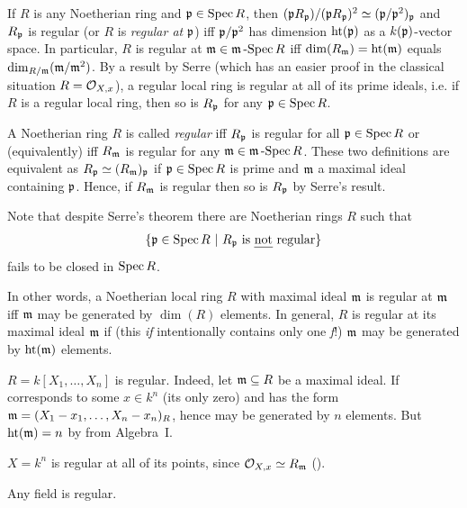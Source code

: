 \documentclass[a4paper,parskip=half,numbers=enddot, DIV=12]{scrreprt}
\begin{document}
\begin{rem}
    If $R$ is any Noetherian ring and $\mathfrak{p}\in \operatorname{Spec} R$, then $(\mathfrak{p} R_{\mathfrak{p}})/(\mathfrak{p} R_{\mathfrak{p}})^2 \simeq (\mathfrak{p}/\mathfrak{p}^2)_{\mathfrak{p}}$ and $R_{\mathfrak{p}}$ is regular (or $R$ is \emph{regular at} $\mathfrak{p}$) iff $\mathfrak{p}/\mathfrak{p}^2$ has dimension $\operatorname{ht}(\mathfrak{p})$ as a $k(\mathfrak{p})$-vector space. In particular, $R$ is regular at $\mathfrak{m}\in\mathfrak{m}\operatorname{-Spec} R$ iff $\dim(R_{\mathfrak{m}}) = \operatorname{ht}(\mathfrak{m})$ equals $\dim_{R/\mathfrak{m}} (\mathfrak{m}/\mathfrak{m}^2)$. By a result by Serre (which has an easier proof in the classical situation $R=\mathcal{O}_{X,x}$), a regular local ring is regular at all of its prime ideals, i.e. if $R$ is a regular local ring, then so is $R_{\mathfrak{p}}$ for any $\mathfrak{p}\in \operatorname{Spec} R$. 
    
    A Noetherian ring $R$ is called \emph{regular} iff $R_{\mathfrak{p}}$ is regular for all $\mathfrak{p}\in\operatorname{Spec} R$ or (equivalently) iff $R_{\mathfrak{m}}$ is regular for any $\mathfrak{m}\in\mathfrak{m}\operatorname{-Spec} R$. These two definitions are equivalent as $R_{\mathfrak{p}}\simeq (R_{\mathfrak{m}})_{\mathfrak{p}}$ if $\mathfrak{p}\in\operatorname{Spec} R$ is prime and $\mathfrak{m}$ a maximal ideal containing $\mathfrak{p}$. Hence, if $R_{\mathfrak{m}}$ is regular then so is $R_{\mathfrak{p}}$ by Serre's result. 
    
    Note that despite Serre's theorem there are Noetherian rings $R$ such that 
    \begin{align*}
    	\left\{\mathfrak{p}\in\operatorname{Spec} R\ \middle|\  R_{\mathfrak{p}}\text{ is \emph{not} regular}\right\}
    \end{align*}
    fails to be closed in $\operatorname{Spec} R$.
\end{rem}
\begin{rem*}
    In other words, a Noetherian local ring $R$ with maximal ideal $\mathfrak{m}$ is regular at $\mathfrak{m}$ iff $\mathfrak{m}$ may be generated by $\dim (R)$ elements. In general, $R$ is regular at its maximal ideal $\mathfrak{m}$ if (this \emph{if} intentionally contains only one \emph{f}!) $\mathfrak{m}$ may be generated by $\operatorname{ht}(\mathfrak{m})$ elements.
\end{rem*}
\begin{example*}
    \begin{alphanumerate}
        \item 
            $R= k[X_1,\ldots,X_n]$ is regular. Indeed, let $\mathfrak{m}\subseteq R$ be a maximal ideal. If corresponds to some $x\in k^n$ (its only zero) and has the form $\mathfrak{m} = ( X_1-x_1,\ldots, X_n-x_n)_R$, hence may be generated by $n$ elements. But $\operatorname{ht}(\mathfrak{m}) = n$ by \cite[Theorem~10]{alg1} from Algebra~I.
        \item 
            $X=k^n$ is regular at all of its points, since $\mathcal{O}_{X,x} \simeq R_{\mathfrak{m}}$ (\cite[Proposition~2.3.4]{alg1}).
        \item 
            Any field is regular.
    \end{alphanumerate}
\end{example*}
\end{document}
